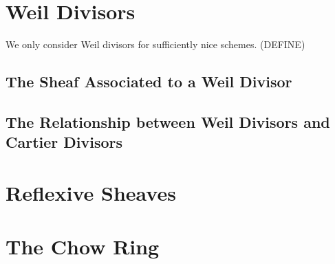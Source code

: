 \documentclass[12pt]{article}
\begin{document}
\section{Weil Divisors}

We only consider Weil divisors for sufficiently nice schemes. (DEFINE)

\subsection{The Sheaf Associated to a Weil Divisor}

\subsection{The Relationship between Weil Divisors and Cartier Divisors}

\section{Reflexive Sheaves}

\section{The Chow Ring}
\end{document}
